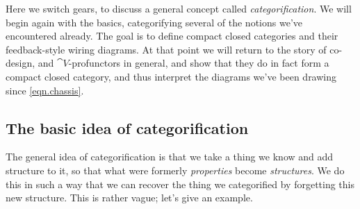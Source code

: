 \documentclass[7Sketches]{subfiles}
\begin{document}
Here we switch gears, to discuss a general concept called \emph{categorification}. We will begin again with the basics, categorifying several of the notions we've encountered already. The goal is to define compact closed categories and their feedback-style wiring diagrams. At that point we will return to the story of co-design, and $\cat{V}$-profunctors in general, and show that they do in fact form a compact closed category, and thus interpret the diagrams we've been drawing since \cref{eqn.chassis}. 

\subsection{The basic idea of categorification}

The general idea of categorification is that we take a thing we know and
add structure to it, so that what were formerly \emph{properties} become
\emph{structures}. We do this in such a way that we can recover the thing we
categorified by forgetting this new structure. This is rather vague; let's give
an example.%
\end{document}
